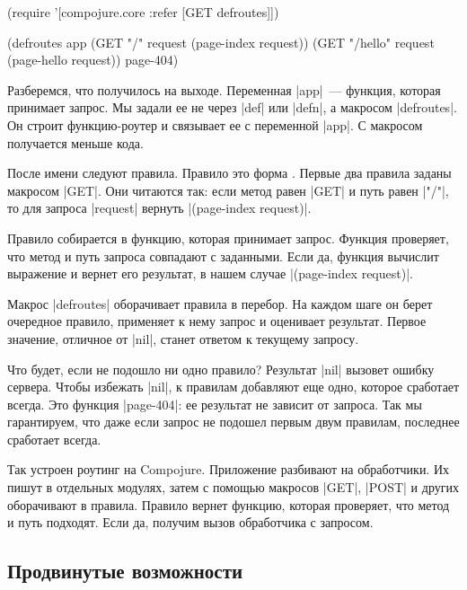 \begin{english}
  \begin{clojure}
(require '[compojure.core :refer [GET defroutes]])

(defroutes app
  (GET "/"      request (page-index request))
  (GET "/hello" request (page-hello request))
  page-404)
  \end{clojure}
\end{english}

Разберемся, что получилось на выходе. Переменная \spverb|app|~--- функция,
которая принимает запрос. Мы задали ее не через \spverb|def| или \spverb|defn|,
а макросом \spverb|defroutes|. Он строит функцию-роутер и связывает ее с
переменной \spverb|app|. С макросом получается меньше кода.

После имени следуют правила. Правило это форма .
Первые два правила заданы макросом \spverb|GET|. Они читаются так:
если метод равен \spverb|GET| и путь равен \spverb|"/"|, то для запроса
\spverb|request| вернуть \spverb|(page-index request)|.

Правило собирается в функцию, которая принимает запрос. Функция проверяет, что
метод и путь запроса совпадают с заданными. Если да, функция вычислит выражение
и вернет его результат, в нашем случае \spverb|(page-index request)|.

Макрос \spverb|defroutes| оборачивает правила в перебор. На каждом шаге он берет
очередное правило, применяет к нему запрос и оценивает результат. Первое
значение, отличное от \spverb|nil|, станет ответом к текущему запросу.

Что будет, если не подошло ни одно правило? Результат \spverb|nil| вызовет
ошибку сервера. Чтобы избежать \spverb|nil|, к правилам добавляют еще одно,
которое сработает всегда. Это функция \spverb|page-404|: ее результат не
зависит от запроса. Так мы гарантируем, что даже если запрос не подошел первым
двум правилам, последнее сработает всегда.

Так устроен роутинг на Compojure. Приложение разбивают на обработчики.  Их пишут
в отдельных модулях, затем с помощью макросов \spverb|GET|, \spverb|POST| и
других оборачивают в правила. Правило вернет функцию, которая проверяет, что
метод и путь подходят. Если да, получим вызов обработчика с запросом.

\subsection{Продвинутые возможности}

